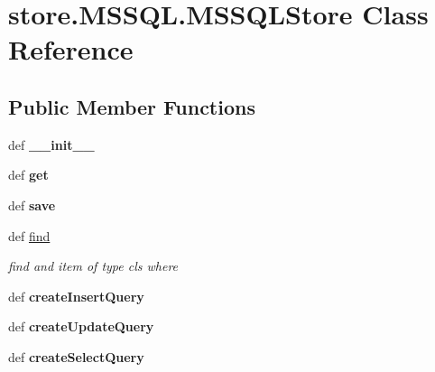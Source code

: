 \hypertarget{classstore_1_1_m_s_s_q_l_1_1_m_s_s_q_l_store}{\section{store.\-M\-S\-S\-Q\-L.\-M\-S\-S\-Q\-L\-Store Class Reference}
\label{classstore_1_1_m_s_s_q_l_1_1_m_s_s_q_l_store}
}
\subsection*{Public Member Functions}
\begin{DoxyCompactItemize}
\item 
\hypertarget{classstore_1_1_m_s_s_q_l_1_1_m_s_s_q_l_store_a891326cdc5a226c9dfe36d2118d37db4}{def {\bfseries \-\_\-\-\_\-init\-\_\-\-\_\-}}\label{classstore_1_1_m_s_s_q_l_1_1_m_s_s_q_l_store_a891326cdc5a226c9dfe36d2118d37db4}

\item 
\hypertarget{classstore_1_1_m_s_s_q_l_1_1_m_s_s_q_l_store_aa806755c8a3e024b1ab7f5fb04001fdc}{def {\bfseries get}}\label{classstore_1_1_m_s_s_q_l_1_1_m_s_s_q_l_store_aa806755c8a3e024b1ab7f5fb04001fdc}

\item 
\hypertarget{classstore_1_1_m_s_s_q_l_1_1_m_s_s_q_l_store_ac324292ba6f55583417f36f6d9b32cb6}{def {\bfseries save}}\label{classstore_1_1_m_s_s_q_l_1_1_m_s_s_q_l_store_ac324292ba6f55583417f36f6d9b32cb6}

\item 
\hypertarget{classstore_1_1_m_s_s_q_l_1_1_m_s_s_q_l_store_a6239ccbc29a7bfcb9a6e971ce6d73b4a}{def \hyperlink{classstore_1_1_m_s_s_q_l_1_1_m_s_s_q_l_store_a6239ccbc29a7bfcb9a6e971ce6d73b4a}{find}}\label{classstore_1_1_m_s_s_q_l_1_1_m_s_s_q_l_store_a6239ccbc29a7bfcb9a6e971ce6d73b4a}

\begin{DoxyCompactList}\small\item\em find and item of type cls where \end{DoxyCompactList}\item 
\hypertarget{classstore_1_1_m_s_s_q_l_1_1_m_s_s_q_l_store_a82473fda8d6d5865ac97a34fdbaf692f}{def {\bfseries create\-Insert\-Query}}\label{classstore_1_1_m_s_s_q_l_1_1_m_s_s_q_l_store_a82473fda8d6d5865ac97a34fdbaf692f}

\item 
\hypertarget{classstore_1_1_m_s_s_q_l_1_1_m_s_s_q_l_store_a1b088d04213bbbf0f3672d34a333eb51}{def {\bfseries create\-Update\-Query}}\label{classstore_1_1_m_s_s_q_l_1_1_m_s_s_q_l_store_a1b088d04213bbbf0f3672d34a333eb51}

\item 
\hypertarget{classstore_1_1_m_s_s_q_l_1_1_m_s_s_q_l_store_a2864128a9a88109f4ad7330cc35a3b26}{def {\bfseries create\-Select\-Query}}\label{classstore_1_1_m_s_s_q_l_1_1_m_s_s_q_l_store_a2864128a9a88109f4ad7330cc35a3b26}

\end{DoxyCompactItemize}
